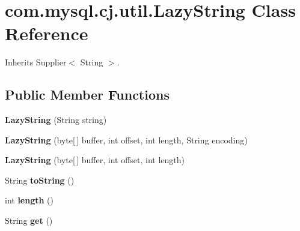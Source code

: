 \hypertarget{classcom_1_1mysql_1_1cj_1_1util_1_1_lazy_string}{}\section{com.\+mysql.\+cj.\+util.\+Lazy\+String Class Reference}
\label{classcom_1_1mysql_1_1cj_1_1util_1_1_lazy_string}


Inherits Supplier$<$ String $>$.

\subsection*{Public Member Functions}
\begin{DoxyCompactItemize}
\item 
\mbox{\label{classcom_1_1mysql_1_1cj_1_1util_1_1_lazy_string_a35e42f1528797d95f7d136a743ebb715}} 
{\bfseries Lazy\+String} (String string)
\item 
\mbox{\label{classcom_1_1mysql_1_1cj_1_1util_1_1_lazy_string_af6a71f4638561312d98f625211b94a28}} 
{\bfseries Lazy\+String} (byte\mbox{[}$\,$\mbox{]} buffer, int offset, int length, String encoding)
\item 
\mbox{\label{classcom_1_1mysql_1_1cj_1_1util_1_1_lazy_string_a217eff2af32cb57ef5307c96e45e621b}} 
{\bfseries Lazy\+String} (byte\mbox{[}$\,$\mbox{]} buffer, int offset, int length)
\item 
\mbox{\label{classcom_1_1mysql_1_1cj_1_1util_1_1_lazy_string_a25acdb668b2966e6e99764dd08177869}} 
String {\bfseries to\+String} ()
\item 
\mbox{\label{classcom_1_1mysql_1_1cj_1_1util_1_1_lazy_string_aba17c82b57c45d15d1d8ec1ba9581a2a}} 
int {\bfseries length} ()
\item 
\mbox{\label{classcom_1_1mysql_1_1cj_1_1util_1_1_lazy_string_ac58f7776e68ba38901a9aa8a356d4adb}} 
String {\bfseries get} ()
\end{DoxyCompactItemize}


